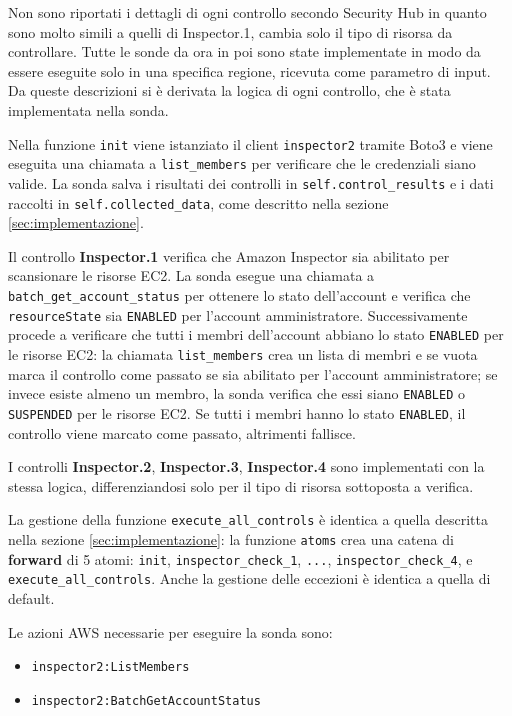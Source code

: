 Non sono riportati i dettagli di ogni controllo secondo Security Hub in quanto sono molto simili a quelli di Inspector.1, cambia solo il tipo di risorsa da controllare. Tutte le sonde da ora in poi sono state implementate in modo da essere eseguite solo in una specifica regione, ricevuta come parametro di input. Da queste descrizioni si è derivata la logica di ogni controllo, che è stata implementata nella sonda.


Nella funzione \texttt{init} viene istanziato il client \texttt{inspector2} tramite Boto3 e viene eseguita una chiamata a \texttt{list\_members} per verificare che le credenziali siano valide. La sonda salva i risultati dei controlli in \texttt{self.control\_results} e i dati raccolti in \texttt{self.collected\_data}, come descritto nella sezione \ref{sec:implementazione}. 

Il controllo \textbf{Inspector.1} verifica che Amazon Inspector sia abilitato per scansionare le risorse EC2. La sonda esegue una chiamata a \texttt{batch\_get\_account\_status} per ottenere lo stato dell'account e verifica che \texttt{resourceState} sia \texttt{ENABLED} per l'account amministratore. Successivamente procede a verificare che tutti i membri dell'account abbiano lo stato \texttt{ENABLED} per le risorse EC2: la chiamata \texttt{list\_members} crea un lista di membri e se vuota marca il controllo come passato se sia abilitato per l'account amministratore; se invece esiste almeno un membro, la sonda verifica che essi siano \texttt{ENABLED} o \texttt{SUSPENDED} per le risorse EC2. Se tutti i membri hanno lo stato \texttt{ENABLED}, il controllo viene marcato come passato, altrimenti fallisce.

I controlli \textbf{Inspector.2}, \textbf{Inspector.3}, \textbf{Inspector.4} sono implementati con la stessa logica, differenziandosi solo per il tipo di risorsa sottoposta a verifica.

La gestione della funzione \texttt{execute\_all\_controls} è identica a quella descritta nella sezione \ref{sec:implementazione}: la funzione \texttt{atoms} crea una catena di \textbf{forward} di 5 atomi: \texttt{init}, \texttt{inspector\_check\_1}, \texttt{...}, \texttt{inspector\_check\_4}, e \texttt{execute\_all\_controls}. Anche la gestione delle eccezioni è identica a quella di default. 

Le azioni AWS necessarie per eseguire la sonda sono:

\begin{itemize}
    \item \texttt{inspector2:ListMembers}
    \item \texttt{inspector2:BatchGetAccountStatus}
\end{itemize}

